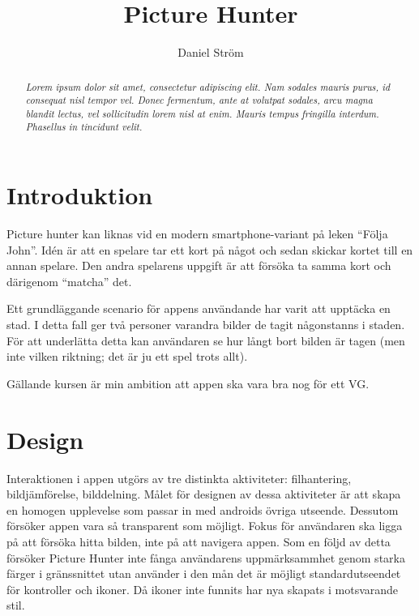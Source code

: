 \documentclass[11px, a4paper]{article}
\title{Picture Hunter}
\author{Daniel Ström \\ \mail{D@nielstrom.se}}
\begin{document}
\maketitle
\begin{abstract}
	\textit{
		Lorem ipsum dolor sit amet, consectetur adipiscing elit. Nam sodales mauris purus, id consequat nisl tempor vel. Donec fermentum, ante at volutpat sodales, arcu magna blandit lectus, vel sollicitudin lorem nisl at enim. Mauris tempus fringilla interdum. Phasellus in tincidunt velit.
	}
	\vspace{5mm}
\end{abstract}

\tableofcontents

\listoffigures


\section{Introduktion}
	Picture hunter kan liknas vid en modern smartphone-variant på leken ``Följa John''. Idén är att en spelare tar ett kort på något och sedan skickar kortet till en annan spelare. Den andra spelarens uppgift är att försöka ta samma kort och därigenom ``matcha'' det.

	Ett grundläggande scenario för appens användande har varit att upptäcka en stad. I detta fall ger två personer varandra bilder de tagit någonstanns i staden. För att underlätta detta kan användaren se hur långt bort bilden är tagen (men inte vilken riktning; det är ju ett spel trots allt).

	Gällande kursen är min ambition att appen ska vara bra nog för ett VG.


\section{Design}

	Interaktionen i appen utgörs av tre distinkta aktiviteter: filhantering, bildjämförelse,	bilddelning. Målet för designen av dessa aktiviteter är att skapa en homogen upplevelse som passar in med androids övriga utseende. Dessutom försöker appen vara så transparent som möjligt. Fokus för användaren ska ligga på att försöka hitta bilden, inte på att navigera appen. Som en följd av detta försöker Picture Hunter inte fånga användarens uppmärksammhet genom starka färger i gränssnittet utan använder i den mån det är möjligt standardutseendet för kontroller och ikoner. Då ikoner inte funnits har nya skapats i motsvarande stil.
\end{document}
